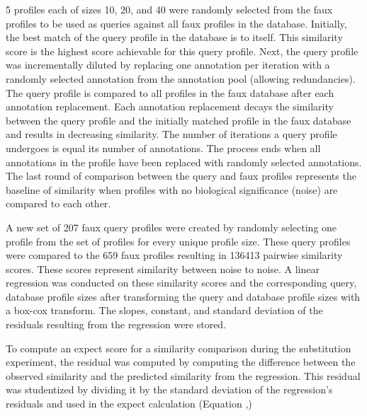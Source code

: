 \documentclass{article}
\begin{document}
5 profiles each of sizes 10, 20, and 40 were randomly selected from the faux profiles to be used as queries against all faux profiles in the database. Initially, the best match of the query profile in the database is to itself. This similarity score is the highest score achievable for this query profile. Next, the query profile was incrementally diluted by replacing one annotation per iteration with a randomly selected annotation from the annotation pool (allowing redundancies). The query profile is compared to all profiles in the faux database after each annotation replacement. Each annotation replacement decays the similarity between the query profile and the initially matched profile in the faux database and results in decreasing similarity. The number of iterations a query profile undergoes is equal its number of annotations. The process ends when all annotations in the profile have been replaced with randomly selected annotations. The last round of comparison between the query and faux profiles represents the baseline of similarity when profiles with no biological significance (noise) are compared to each other.

A new set of 207 faux query profiles were created by randomly selecting one profile from the set of profiles for every unique profile size. These query profiles were compared to the 659 faux profiles resulting in 136413 pairwise similarity scores. These scores represent similarity between noise to noise. A linear regression was conducted on these similarity scores and the corresponding query, database profile sizes after transforming the query and database profile sizes with a box-cox transform. The slopes, constant, and standard deviation of the residuals resulting from the regression were stored. 

To compute an expect score for a similarity comparison during the substitution experiment, the residual was computed by computing the difference between the observed similarity and the predicted similarity from the regression. This residual was studentized by dividing it by the standard deviation of the regression's residuals and used in the expect calculation (Equation \label{pvalue},\label{expect})
\end{document}
